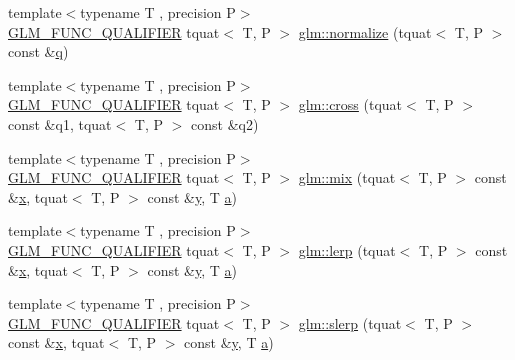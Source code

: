 \begin{DoxyCompactItemize}
\item 
{\footnotesize template$<$typename T , precision P$>$ }\\\mbox{\hyperlink{setup_8hpp_a33fdea6f91c5f834105f7415e2a64407}{G\+L\+M\+\_\+\+F\+U\+N\+C\+\_\+\+Q\+U\+A\+L\+I\+F\+I\+ER}} tquat$<$ T, P $>$ \mbox{\hyperlink{group__gtc__quaternion_ga35b6bcb22ac6d1e4a85440f5b69bdf86}{glm\+::normalize}} (tquat$<$ T, P $>$ const \&\mbox{\hyperlink{glad_8h_a514729309336df22bcc8eda979d6ced4}{q}})
\item 
{\footnotesize template$<$typename T , precision P$>$ }\\\mbox{\hyperlink{setup_8hpp_a33fdea6f91c5f834105f7415e2a64407}{G\+L\+M\+\_\+\+F\+U\+N\+C\+\_\+\+Q\+U\+A\+L\+I\+F\+I\+ER}} tquat$<$ T, P $>$ \mbox{\hyperlink{namespaceglm_ae21800a9767f21b7649c196485d924b4}{glm\+::cross}} (tquat$<$ T, P $>$ const \&q1, tquat$<$ T, P $>$ const \&q2)
\item 
{\footnotesize template$<$typename T , precision P$>$ }\\\mbox{\hyperlink{setup_8hpp_a33fdea6f91c5f834105f7415e2a64407}{G\+L\+M\+\_\+\+F\+U\+N\+C\+\_\+\+Q\+U\+A\+L\+I\+F\+I\+ER}} tquat$<$ T, P $>$ \mbox{\hyperlink{group__gtc__quaternion_ga31cc82178742c36450f5662bd4fb30b0}{glm\+::mix}} (tquat$<$ T, P $>$ const \&\mbox{\hyperlink{glad_8h_a92d0386e5c19fb81ea88c9f99644ab1d}{x}}, tquat$<$ T, P $>$ const \&\mbox{\hyperlink{glad_8h_a66ddd433d2cacfe27f5906b7e86faeed}{y}}, T \mbox{\hyperlink{glad_8h_ac8729153468b5dcf13f971b21d84d4e5}{a}})
\item 
{\footnotesize template$<$typename T , precision P$>$ }\\\mbox{\hyperlink{setup_8hpp_a33fdea6f91c5f834105f7415e2a64407}{G\+L\+M\+\_\+\+F\+U\+N\+C\+\_\+\+Q\+U\+A\+L\+I\+F\+I\+ER}} tquat$<$ T, P $>$ \mbox{\hyperlink{group__gtc__quaternion_ga5692804fa4db9e762a1c19b607e54435}{glm\+::lerp}} (tquat$<$ T, P $>$ const \&\mbox{\hyperlink{glad_8h_a92d0386e5c19fb81ea88c9f99644ab1d}{x}}, tquat$<$ T, P $>$ const \&\mbox{\hyperlink{glad_8h_a66ddd433d2cacfe27f5906b7e86faeed}{y}}, T \mbox{\hyperlink{glad_8h_ac8729153468b5dcf13f971b21d84d4e5}{a}})
\item 
{\footnotesize template$<$typename T , precision P$>$ }\\\mbox{\hyperlink{setup_8hpp_a33fdea6f91c5f834105f7415e2a64407}{G\+L\+M\+\_\+\+F\+U\+N\+C\+\_\+\+Q\+U\+A\+L\+I\+F\+I\+ER}} tquat$<$ T, P $>$ \mbox{\hyperlink{group__gtc__quaternion_ga22b438c7252f3fa5b773c9882471652a}{glm\+::slerp}} (tquat$<$ T, P $>$ const \&\mbox{\hyperlink{glad_8h_a92d0386e5c19fb81ea88c9f99644ab1d}{x}}, tquat$<$ T, P $>$ const \&\mbox{\hyperlink{glad_8h_a66ddd433d2cacfe27f5906b7e86faeed}{y}}, T \mbox{\hyperlink{glad_8h_ac8729153468b5dcf13f971b21d84d4e5}{a}})

\end{DoxyCompactItemize}
